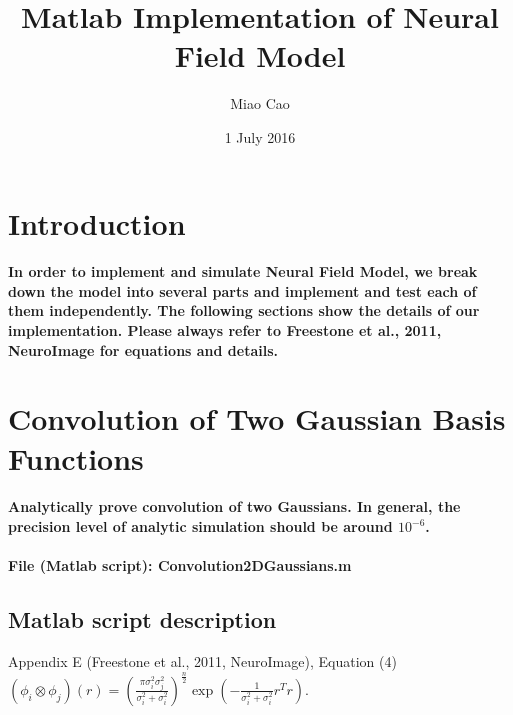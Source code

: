 \documentclass[a4paper, 12pt, english]{article}
\title{Matlab Implementation of Neural Field Model}
\author{Miao Cao}
\date{1 July 2016}
\begin{document}
\begin{titlepage}\centering
\vspace*{\fill}
\maketitle
\vspace*{\fill}
\end{titlepage}

\tableofcontents

\newpage



\section{Introduction}
\paragraph{In order to implement and simulate Neural Field Model, we break down
the model into several parts and implement and test each of them independently. The
following sections show the details of our implementation. Please always refer to
Freestone et al., 2011, NeuroImage for equations and details.}

\newpage




\section{Convolution of Two Gaussian Basis Functions}

\paragraph{Analytically prove convolution of two Gaussians. In general, the
precision level of analytic simulation should be around $10^{-6}$.}

\paragraph{File (Matlab script): Convolution2DGaussians.m}

\subsection*{Matlab script description}

Appendix E (Freestone et al., 2011, NeuroImage), Equation (4) $\left(\phi_{i}\otimes\phi_{j}\right)(r)=(\frac{\pi\sigma_{i}^{2}\sigma_{j}^{2}}{\sigma_{i}^{2}+\sigma_{i}^{2}})^{\frac{n}{2}}\exp(-\frac{1}{\sigma_{i}^{2}+\sigma_{i}^{2}}r^{T}r)$.
\end{document}
